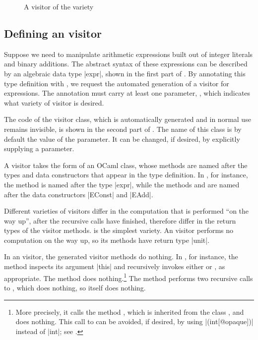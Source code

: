 \documentclass[11pt,a4paper,twoside]{article}
\begin{document}

\begin{figure}[t]
\vspace{-\baselineskip}
\caption{A visitor of the \iter variety}
\label{fig:expr00}
\end{figure}

\subsection{Defining an \iter visitor}
\label{sec:intro:iter:def}

Suppose we need to manipulate arithmetic expressions built out of integer
literals and binary additions. The abstract syntax of these expressions can be
described by an algebraic data type \oc|expr|, shown in the first part of
.
%
By annotating this type definition with \derivingvisitors, we request the
automated generation of a visitor for expressions. The annotation
\derivingvisitors must carry at least one parameter, \variety, which indicates
what variety of visitor is desired.

The code of the visitor class, which is automatically generated and in normal
use remains invisible, is shown in the second part of . The
name of this class is by default the value of the \variety parameter. It can
be changed, if desired, by explicitly supplying a \name parameter.

A visitor takes the form of an OCaml class, whose methods are named after the
types and data constructors that appear in the type definition. In
, for instance, the method  is named after
the type \oc|expr|, while the methods  and
 are named after the data constructors \oc|EConst| and
\oc|EAdd|.

Different varieties of visitors differ in the computation that is performed
``on the way up'', after the recursive calls have finished, therefore differ
in the return types of the visitor methods. \iter is the simplest variety. An
\iter visitor performs no computation on the way up, so its methods have
return type \oc|unit|.

In an \iter visitor, the generated visitor methods do nothing. In
, for instance, the method  inspects its
argument \oc|this| and recursively invokes either  or
, as appropriate. The method  does
nothing.\footnote{More precisely, it calls the method ,
  which is inherited from the class , and does
  nothing. This call to  can be avoided, if desired, by using
  \oc|(int[@opaque])| instead of \oc|int|; see .} The method
 performs two recursive calls to ,
which does nothing, so  itself does nothing.
\end{document}
